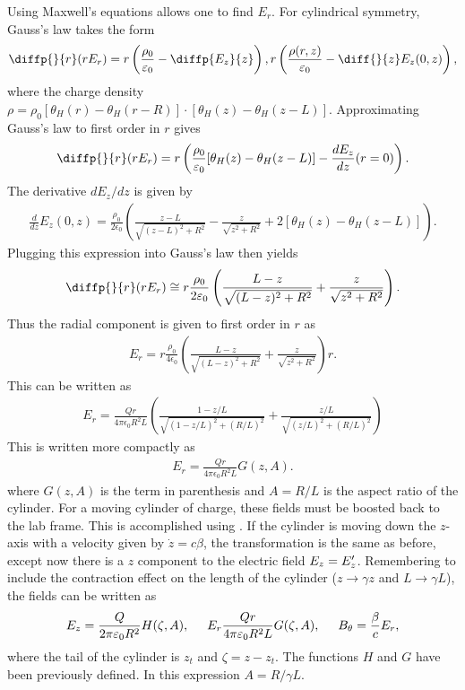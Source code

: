 Using Maxwell's equations allows one to find $E_{r}$. For cylindrical symmetry,
Gauss's law takes the form
%
\begin{eqnarray}
\diffp{}{r}(r E_{r}) =
r\left(\frac{\rho_0}{\epsilon_0}-\diffp{E_z}{z}\right),\label{eq:FindErho}
r\left(\frac{\rho(r,z)}{\epsilon_0}-\diff{}{z}E_z(0,z)\right),
\nonumber
\end{eqnarray}
%
where the charge density $\rho = \rho_0[\theta_H(r)-\theta_H(r-R)]\cdot
[\theta_H(z)-\theta_H(z-L)]$. Approximating Gauss's law to first order in $r$
gives
%
\begin{eqnarray}
\diffp{}{r}(r E_{r}) =
r\left(\frac{\rho_0}{\epsilon_0}[\theta_H(z)-\theta_H(z-L)]-\frac{d E_z} {dz}(r=0)\right).
\end{eqnarray}
%
The derivative $dE_z/dz$ is given by
%
\begin{eqnarray}
\frac{d}{dz}E_z(0,z) = \frac{\rho_0}{2\epsilon_0}
\left(\frac{z-L}{\sqrt{(z-L)^2+R^2}}
-\frac{z}{\sqrt{z^2+R^2}} + 2\left[\theta_H(z)-\theta_H(z-L)\right]
\right).
\end{eqnarray}
%
Plugging this expression into Gauss's law then yields
%
\begin{eqnarray}
\diffp{}{r}(r E_{r})\cong r \frac{\rho_0}{2\epsilon_0}
\left(\frac{L-z}{\sqrt{(L-z)^2+R^2}}+\frac{z}{\sqrt{z^2+R^2}}\right).
\end{eqnarray}
%
Thus the radial component is given to first order in $r$ as
%
\begin{eqnarray}
E_{r}=r\frac{\rho_0}{4\epsilon_0}
\left(\frac{L-z}{\sqrt{(L-z)^2+R^2}}+\frac{z}{\sqrt{z^2+R^2}}\right)r.\nonumber
\end{eqnarray}
%
This can be written as
%
\begin{eqnarray}
E_{r}=\frac{Qr}{4\pi\epsilon_0R^2L}
\left(\frac{1-z/L}{\sqrt{(1-z/L)^2+(R/L)^2}}+\frac{z/L}{\sqrt{(z/L)^2+(R/L)^2}}\right)
\end{eqnarray}
%
This is written more compactly as
%
\begin{eqnarray}
E_{r}=\frac{Qr}{4\pi\epsilon_0R^2L}G(z,A).
\end{eqnarray}
%
where $G(z,A)$ is the term in parenthesis and $A=R/L$ is the aspect ratio of the
cylinder. For a moving cylinder of charge, these fields must be boosted back
to the lab frame. This is accomplished using . If the
cylinder is moving down the $z$-axis with a velocity given by $\dot z=c\beta$,
the transformation is the same as before, except now there is a $z$ component to
the electric field $E_z = E_z^{\prime}$. Remembering to include the contraction
effect on the length of the cylinder ($z\rightarrow \gamma z$ and $L\rightarrow
\gamma L $), the fields can be written as
%
\begin{eqnarray}
E_z = \frac{Q}{2\pi\epsilon_0R^2} H(\zeta, A), \hspace{0.5cm} E_r \frac{Qr}{4\pi\epsilon_0R^2L} G(\zeta, A), \hspace{0.5cm}
B_{\theta} = \frac{\beta}{c}E_r,
\end{eqnarray}
%
where the tail of the cylinder is $z_t$ and $\zeta = z - z_{t}$. The functions
$H$ and $G$ have been previously defined. In this expression $A = R/\gamma L$.

